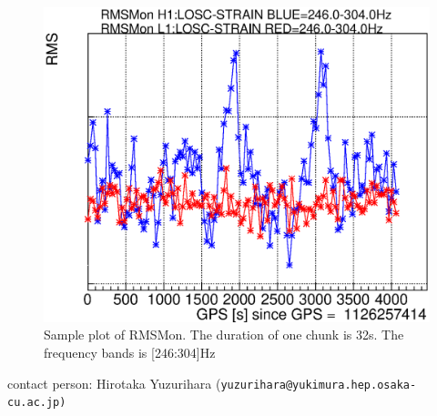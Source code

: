 \begin{figure}[t]
  \begin{center}
    \includegraphics[width=0.9\hsize]{./fig/RMSMon/sample_246-304.eps}
    \caption{Sample plot of RMSMon. The duration of one chunk is 32s. The frequency bands is [246:304]Hz}
     \label{fig:RMS2}
  \end{center}
\end{figure}

{\noindent \small contact person: Hirotaka Yuzurihara (\tt yuzurihara@yukimura.hep.osaka-cu.ac.jp)}

